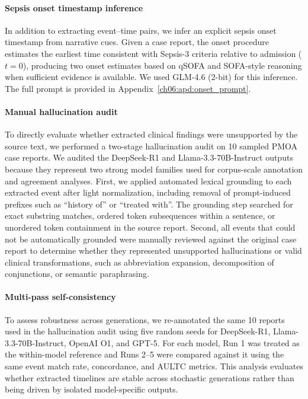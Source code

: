 \paragraph{Sepsis onset timestamp inference}
\label{ch06:sec:onset-inference}
In addition to extracting event--time pairs, we infer an explicit sepsis onset timestamp from narrative cues.
Given a case report, the onset procedure estimates the earliest time consistent with Sepsis-3 criteria relative to admission ($t=0$), producing two onset estimates based on qSOFA and SOFA-style reasoning when sufficient evidence is available.
We used GLM-4.6 (2-bit) for this inference.
The full prompt is provided in Appendix~\ref{ch06:apd:onset_prompt}.


\paragraph{Manual hallucination audit}
\label{ch06:sec:hallucination_audit_methods}
To directly evaluate whether extracted clinical findings were unsupported by the source text, we performed a two-stage hallucination audit on 10 sampled PMOA case reports.
We audited the DeepSeek-R1 and Llama-3.3-70B-Instruct outputs because they represent two strong model families used for corpus-scale annotation and agreement analyses.
First, we applied automated lexical grounding to each extracted event after light normalization, including removal of prompt-induced prefixes such as ``history of'' or ``treated with''.
The grounding step searched for exact substring matches, ordered token subsequences within a sentence, or unordered token containment in the source report.
Second, all events that could not be automatically grounded were manually reviewed against the original case report to determine whether they represented unsupported hallucinations or valid clinical transformations, such as abbreviation expansion, decomposition of conjunctions, or semantic paraphrasing.

\paragraph{Multi-pass self-consistency}
\label{ch06:sec:self_consistency_methods}
To assess robustness across generations, we re-annotated the same 10 reports used in the hallucination audit using five random seeds for DeepSeek-R1, Llama-3.3-70B-Instruct, OpenAI O1, and GPT-5.
For each model, Run 1 was treated as the within-model reference and Runs 2--5 were compared against it using the same event match rate, concordance, and AULTC metrics.
This analysis evaluates whether extracted timelines are stable across stochastic generations rather than being driven by isolated model-specific outputs.

